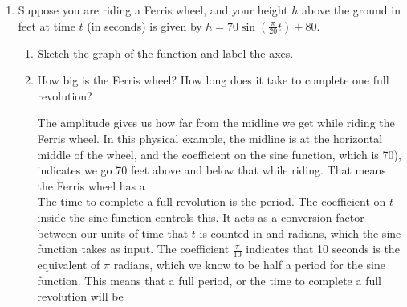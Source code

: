 \documentclass[main]{subfiles}
\begin{document}
\begin{enumerate}[resume]
\item 
    Suppose you are riding a Ferris wheel, and your height $h$ above the ground in feet at time $t$ (in seconds) is given by $h=70\sin(\frac{\pi}{20}t)+80$.
\begin{enumerate}
\item
\begin{problem}
Sketch the graph of the function and label the axes.
\end{problem}

\begin{solution}
    \begin{center}
    \end{center}
\end{solution}

\item
\begin{problem}
How big is the Ferris wheel? How long does it take to complete one full revolution?
\end{problem}
\pspace{\vfill}

\begin{solution}
    The amplitude gives us how far from the midline we get while riding the Ferris wheel. In this physical example, the midline is at the horizontal middle of the wheel, and the coefficient on the sine function, which is 70), indicates we go 70 feet above and below that while riding. That means the Ferris wheel has a \\
    The time to complete a full revolution is the period. The coefficient on $t$ inside the sine function controls this. It acts as a conversion factor between our units of time that $t$ is counted in and radians, which the sine function takes as input. The coefficient $\frac{\pi}{10}$ indicates that 10 seconds is the equivalent of $\pi$ radians, which we know to be half a period for the sine function. This means that a full period, or the time to complete a full revolution will be 
\end{solution}


\end{enumerate}
\end{enumerate}
\end{document}

